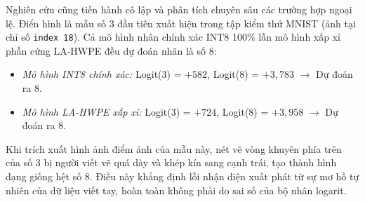 \documentclass[conference]{IEEEtran}
\begin{document}
Nghiên cứu cũng tiến hành cô lập và phân tích chuyên sâu các trường hợp ngoại lệ. Điển hình là mẫu số 3 đầu tiên xuất hiện trong tập kiểm thử MNIST (ảnh tại chỉ số \texttt{index 18}). Cả mô hình nhân chính xác INT8 100\% lẫn mô hình xấp xỉ phần cứng LA-HWPE đều dự đoán nhãn là số 8:
\begin{itemize}
    \item \textit{Mô hình INT8 chính xác:} Logit(3) = $+582$, Logit(8) = $+3,783$ $\to$ Dự đoán ra 8.
    \item \textit{Mô hình LA-HWPE xấp xỉ:} Logit(3) = $+724$, Logit(8) = $+3,958$ $\to$ Dự đoán ra 8.
\end{itemize}
Khi trích xuất hình ảnh điểm ảnh của mẫu này, nét vẽ vòng khuyên phía trên của số 3 bị người viết vẽ quá dày và khép kín sang cạnh trái, tạo thành hình dạng giống hệt số 8. Điều này khẳng định lỗi nhận diện xuất phát từ sự mơ hồ tự nhiên của dữ liệu viết tay, hoàn toàn không phải do sai số của bộ nhân logarit.
\end{document}
